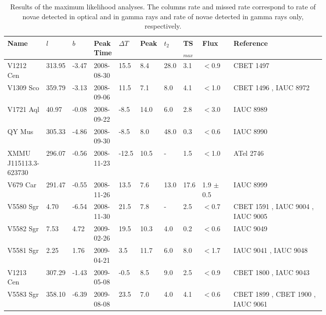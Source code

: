 \begin{landscape}
\begin{tiny}
\begin{table*}[!t]
\caption{Results of the maximum likelihood analyses. The columns rate and missed rate correspond to rate of novae detected in optical and in gamma rays and rate of novae detected in gamma rays only, respectively.}
\centering
\begin{tabular}{ L{0.07\linewidth} p{0.03\linewidth}  p{0.04\linewidth} p{0.07\linewidth} p{0.03\linewidth} p{0.04\linewidth} p{0.04\linewidth} p{0.03\linewidth} p{0.1\linewidth}  L{0.3\linewidth} }
\hline
\hline
Name & $l$     & $b$         & Peak Time &$\Delta T$  & Peak & $t_2$  & TS$_{max}$ & Flux                             & Reference\\
\hline
V1212 Cen & 313.95 & -3.47 & 2008-08-30 & 15.5 & 8.4 & 28.0 & 3.1 & $<$0.9 & CBET 1497 \citep{CBET1497}\\
V1309 Sco & 359.79 & -3.13 & 2008-09-06 & 11.5 & 7.1 & 8.0 & 4.1 & $<$1.0 & CBET 1496 \citep{CBET1496}, IAUC 8972 \citep{IAUC8972}\\
V1721 Aql & 40.97 & -0.08 & 2008-09-22 & -8.5 & 14.0 & 6.0 & 2.8 & $<$3.0 & IAUC 8989 \citep{IAUC8989}\\
QY Mus & 305.33 & -4.86 & 2008-09-30 & -8.5 & 8.0 & 48.0 & 0.3 & $<$0.6 & IAUC 8990 \citep{IAUC8990}\\
XMMU J115113.3-623730 & 296.07 & -0.56 & 2008-11-23 & -12.5 & 10.5 & - & 1.5 & $<$1.0 & ATel 2746 \citep{ATel2746}\\
V679 Car & 291.47 & -0.55 & 2008-11-26 & 13.5 & 7.6 & 13.0 & 17.6 & 1.9 $\pm$ 0.5 & IAUC 8999 \citep{IAUC8999}\\
V5580 Sgr & 4.70 & -6.54 & 2008-11-30 & 21.5 & 7.8 & - & 2.5 & $<$0.7 & CBET 1591 \citep{CBET1591}, IAUC 9004 \citep{IAUC9004}, IAUC 9005 \citep{IAUC9005}\\
V5582 Sgr & 7.53 & 4.72 & 2009-02-26 & 19.5 & 10.3 & 4.0 & 0.2 & $<$0.6 & IAUC 9049 \citep{IAUC9049}\\
V5581 Sgr & 2.25 & 1.76 & 2009-04-21 & 3.5 & 11.7 & 6.0 & 8.0 & $<$1.7 & IAUC 9041 \citep{IAUC9041}, IAUC 9048 \citep{IAUC9048}\\
V1213 Cen & 307.29 & -1.43 & 2009-05-08 & -0.5 & 8.5 & 9.0 & 2.5 & $<$0.9 & CBET 1800 \citep{CBET1800}, IAUC 9043 \citep{IAUC9043}\\
V5583 Sgr & 358.10 & -6.39 & 2009-08-08 & 23.5 & 7.0 & 4.0 & 4.1 & $<$0.6 & CBET 1899 \citep{CBET1899}, CBET 1900 \citep{CBET1900}, IAUC 9061 \citep{IAUC9061}\\

\end{tabular}
\end{table*}
\end{tiny}
\end{landscape}
